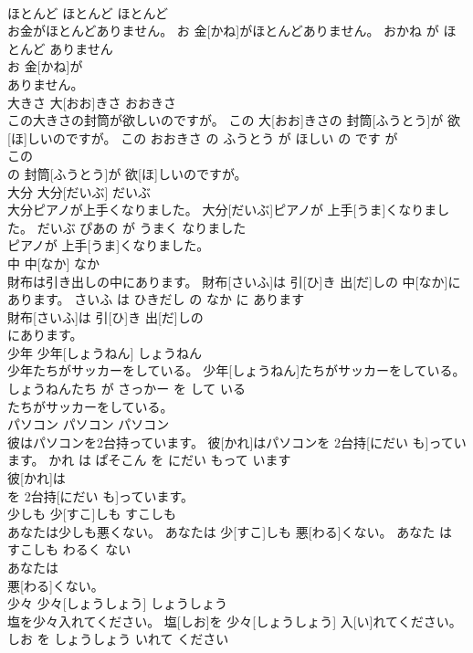 \documentclass[8pt]{extreport}
\begin{document}
\begin{CJK}{UTF8}{min}
\\	ほとんど	ほとんど	ほとんど	
\\	お金がほとんどありません。	お 金[かね]がほとんどありません。	おかね が ほとんど ありません	
\\	お 金[かね]が
\\	ありません。			
\\	大きさ	大[おお]きさ	おおきさ	
\\	この大きさの封筒が欲しいのですが。	この 大[おお]きさの 封筒[ふうとう]が 欲[ほ]しいのですが。	この おおきさ の ふうとう が ほしい の です が	
\\	この
\\	の 封筒[ふうとう]が 欲[ほ]しいのですが。			
\\	大分	大分[だいぶ]	だいぶ	
\\	大分ピアノが上手くなりました。	大分[だいぶ]ピアノが 上手[うま]くなりました。	だいぶ ぴあの が うまく なりました	
\\	ピアノが 上手[うま]くなりました。			
\\	中	中[なか]	なか	
\\	財布は引き出しの中にあります。	財布[さいふ]は 引[ひ]き 出[だ]しの 中[なか]にあります。	さいふ は ひきだし の なか に あります	
\\	財布[さいふ]は 引[ひ]き 出[だ]しの
\\	にあります。			
\\	少年	少年[しょうねん]	しょうねん	
\\	少年たちがサッカーをしている。	少年[しょうねん]たちがサッカーをしている。	しょうねんたち が さっかー を して いる	
\\	たちがサッカーをしている。			
\\	パソコン	パソコン	パソコン	
\\	彼はパソコンを2台持っています。	彼[かれ]はパソコンを 2台持[にだい も]っています。	かれ は ぱそこん を にだい もって います	
\\	彼[かれ]は
\\	を 2台持[にだい も]っています。			
\\	少しも	少[すこ]しも	すこしも	
\\	あなたは少しも悪くない。	あなたは 少[すこ]しも 悪[わる]くない。	あなた は すこしも わるく ない	
\\	あなたは
\\	悪[わる]くない。			
\\	少々	少々[しょうしょう]	しょうしょう	
\\	塩を少々入れてください。	塩[しお]を 少々[しょうしょう] 入[い]れてください。	しお を しょうしょう いれて ください	

\end{CJK}
\end{document}
